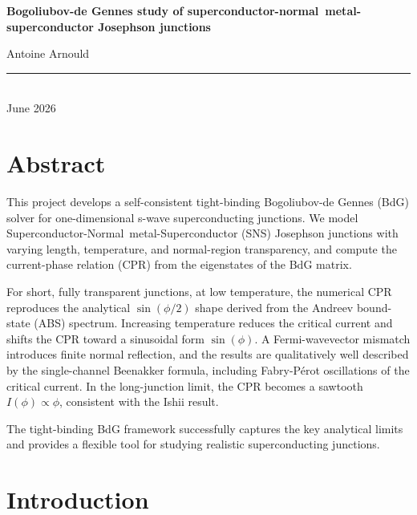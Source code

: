 \documentclass[11pt,a4paper,twoside,openany]{report}
\author{Antoine Arnould}
\date{\normalsize \today}
\begin{document}
\begin{titlepage}
\centering

\vspace*{5cm}

{\huge\bfseries
Bogoliubov-de Gennes study of
superconductor-normal~metal-superconductor
Josephson junctions\par}

\vspace{2cm}

{\large Antoine Arnould\\[2pt]}



\vfill
\rule{\textwidth}{0.4pt}\\[0.4cm]
{\normalsize June 2026}
\end{titlepage}

\chapter*{Abstract}

This project develops a self-consistent tight-binding Bogoliubov-de Gennes (BdG) solver for one-dimensional s-wave superconducting junctions. We model Superconductor-Normal~metal-Superconductor (SNS) Josephson junctions with varying length, temperature, and normal-region transparency, and compute the current-phase relation (CPR) from the eigenstates of the BdG matrix.

For short, fully transparent junctions, at low temperature, the numerical CPR reproduces the analytical \(\sin(\phi/2)\) shape derived from the Andreev bound-state (ABS) spectrum.
Increasing temperature reduces the critical current and shifts the CPR toward a sinusoidal form \(\sin(\phi)\).
A Fermi-wavevector mismatch introduces finite normal reflection, and the results are qualitatively well described by the single-channel Beenakker formula, including Fabry-Pérot oscillations of the critical current.
In the long-junction limit, the CPR becomes a sawtooth \(I(\phi) \propto \phi\), consistent with the Ishii result.


The tight-binding BdG framework successfully captures the key analytical limits and provides a flexible tool for studying realistic superconducting junctions.


\clearpage
\setcounter{tocdepth}{1}
\tableofcontents



\clearpage

\chapter{Introduction}
\end{document}
